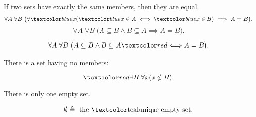 
\begin{frame}{}
  \begin{axiom}
    If two sets have exactly the same members, then they are equal.
    \[
      \forall A\; \forall B\; \big(\forall  \blue{x} (\blue{x} \in A \iff \blue{x} \in B) \implies A = B \big).
    \]
    \[
      \forall A\; \forall B\; \big(A \subseteq B \land B \subseteq A \implies A = B \big).
    \]
  \end{axiom}

  \pause
  \vspace{0.30cm}
  \[
    \forall A\; \forall B\; \big(A \subseteq B \land B \subseteq A \red{\iff} A = B \big).
  \]
\end{frame}

\begin{frame}{}
  \begin{axiom}
    There is a set having no members:

    \[
      \red{\exists B}\; \forall x (x \notin B).
    \]
  \end{axiom}

  \pause
  \vspace{0.50cm}
  \begin{theorem}
    There is only one empty set.
  \end{theorem}

  \pause
  \vspace{0.50cm}
  \begin{definition}[``$\emptyset$'']
    \[
      \emptyset \triangleq \text{ the \teal{unique} empty set}.
    \]
  \end{definition}
\end{frame}
